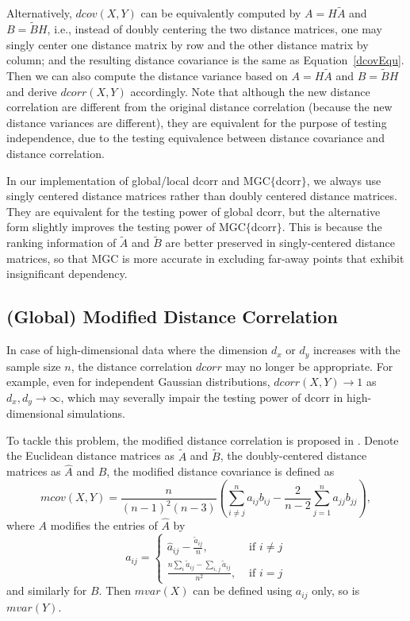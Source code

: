 \documentclass[11pt]{article}
\begin{document}
Alternatively, $dcov(X,Y)$ can be equivalently computed by $A=H\tilde{A}$ and $B=\tilde{B}H$, i.e., instead of doubly centering the two distance matrices, one may singly center one distance matrix by row and the other distance matrix by column; and the resulting distance covariance is the same as Equation~\ref{dcovEqu}. Then we can also compute the distance variance based on $A=H\tilde{A}$ and $B=\tilde{B}H$ and derive $dcorr(X,Y)$ accordingly. Note that although the new distance correlation are different from the original distance correlation (because the new distance variances are different), they are equivalent for the purpose of testing independence, due to the testing equivalence between distance covariance and distance correlation.

In our implementation of global/local dcorr and MGC$\{$dcorr$\}$, we always use singly centered distance matrices rather than doubly centered distance matrices. They are equivalent for the testing power of global dcorr, but the alternative form slightly improves the testing power of MGC$\{$dcorr$\}$. This is because the ranking information of $\tilde{A}$ and $\tilde{B}$ are better preserved in singly-centered distance matrices, so that MGC is more accurate in excluding far-away points that exhibit insignificant dependency.

\subsection{(Global) Modified Distance Correlation}
\label{appen:mcorr}
In case of high-dimensional data where the dimension $d_{x}$ or $d_{y}$ increases with the sample size $n$, the distance correlation $dcorr$ may no longer be appropriate. For example, even for independent Gaussian distributions, $dcorr(X,Y) \rightarrow 1$ as $d_{x}, d_{y} \rightarrow \infty$, which may severally impair the testing power of dcorr in high-dimensional simulations.

To tackle this problem, the modified distance correlation is proposed in \cite{SzekelyRizzo2013a}. Denote the Euclidean distance matrices as $\tilde{A}$ and $\tilde{B}$, the doubly-centered distance matrices as $\hat{A}$ and $\hat{B}$, the modified distance covariance is defined as
\begin{equation}
\label{mcovEqu}
mcov(X,Y)=\frac{n}{(n-1)^2(n-3)}(\sum_{i \neq j}^{n}a_{ij}b_{ij}-\frac{2}{n-2}\sum_{j=1}^{n}a_{jj}b_{jj}),
\end{equation}
where $A$ modifies the entries of $\hat{A}$ by
\[a_{ij} = \left\{
  \begin{array}{lr}
    \hat{a}_{ij}-\frac{\tilde{a}_{ij}}{n}, & \mbox{ if } i \neq j \\
    \frac{n\sum_{i}\tilde{a}_{ij}-\sum_{i,j}\tilde{a}_{ij}}{n^2}, &\mbox{ if } i = j 
  \end{array}
\right.
\]
and similarly for $B$. Then $mvar(X)$ can be defined using $a_{ij}$ only, so is $mvar(Y)$. 
\end{document}
